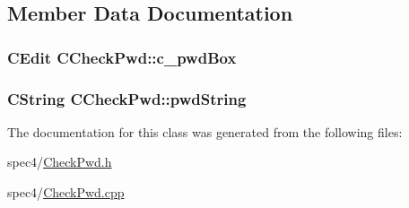 \subsection{Member Data Documentation}
\hypertarget{classCCheckPwd_a65416e66181e60e1c89c8afc3340da11}{
\subsubsection[{c\_\-pwdBox}]{\setlength{\rightskip}{0pt plus 5cm}CEdit {\bf CCheckPwd::c\_\-pwdBox}}}
\label{classCCheckPwd_a65416e66181e60e1c89c8afc3340da11}
\hypertarget{classCCheckPwd_ac2768da28ea7f8153d66f606add42fc2}{
\subsubsection[{pwdString}]{\setlength{\rightskip}{0pt plus 5cm}CString {\bf CCheckPwd::pwdString}}}
\label{classCCheckPwd_ac2768da28ea7f8153d66f606add42fc2}


The documentation for this class was generated from the following files:\begin{DoxyCompactItemize}
\item 
spec4/\hyperlink{CheckPwd_8h}{CheckPwd.h}\item 
spec4/\hyperlink{CheckPwd_8cpp}{CheckPwd.cpp}\end{DoxyCompactItemize}
